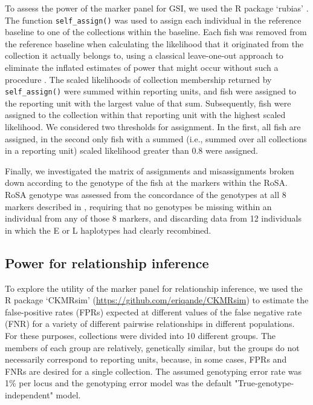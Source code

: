 To assess the power of the marker panel for GSI, we used the R package
`rubias' \citep{moran2019bayesian}.  The function {\tt self\_assign()} was used
to assign each individual in the reference baseline to one of the
collections within the baseline.  Each fish was removed from the reference baseline
when calculating the likelihood that it originated from the collection it actually belongs
to, using a classical leave-one-out approach to eliminate the inflated estimates of
power that might occur without such a procedure \citep{anderson2008improved}.
The scaled likelihoods of collection membership returned by
{\tt self\_assign()} were summed within reporting units, and fish were
assigned to the reporting unit with the largest value of that sum.  Subsequently,
fish were assigned to the collection within that reporting unit with the highest
scaled likelihood.  We considered two thresholds for assignment.  In the first,
all fish are assigned, in the second only fish with a summed (i.e., summed
over all collections in a reporting unit)
scaled likelihood greater than 0.8 were assigned.

Finally, we investigated the matrix of assignments and misassignments
broken down according to the genotype of the fish at the markers within
the RoSA.  RoSA genotype \citep[EE, EL, or LL, see~][]{thompson2020complex}
was assessed from the concordance of the genotypes
at all 8 markers described in \citep{thompson2020complex}, requiring that no genotypes be missing
within an individual from any of those 8 markers, and discarding data from 12 individuals
in which the E or L haplotypes had clearly recombined.



\subsection*{Power for relationship inference}

To explore the utility of the marker panel for relationship inference, we used
the R package `CKMRsim'
(\url{https://github.com/eriqande/CKMRsim})
to estimate the false-positive rates (FPRs) expected at
different values of the false negative rate (FNR) for a variety of different pairwise
relationships in different populations.  For these purposes, collections were divided into
10 different groups.  The members of each group are
relatively, genetically similar, but the groups do not necessarily correspond to reporting
units, because, in some cases, FPRs and FNRs are desired for a single
collection.   The assumed genotyping error rate
was 1\% per locus and the genotyping error model was the default
"True-genotype-independent" model.


